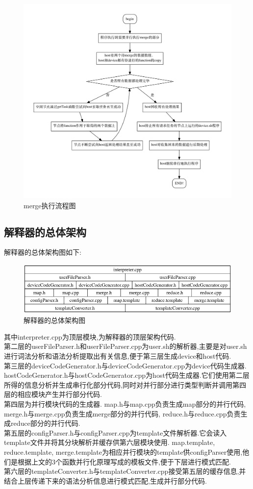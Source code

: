 \documentclass[paper=a4]{ctexart} %
\numberwithin{equation}{section} %
\numberwithin{figure}{section} %
\numberwithin{table}{section} %
\newcommand{\n}{\\\indent}
\begin{document}
\begin{figure}[htbp]
\centering
\includegraphics[width=1\textwidth]{pic/graph_merge.pdf}
\caption{merge执行流程图}
\end{figure}

\clearpage

\subsection{解释器的总体架构}

解释器的总体架构图如下:
\begin{figure}[htbp]
\centering
\includegraphics[width=1\textwidth]{pic/arch.jpg}
\caption{解释器的总体架构图}
\end{figure}

其中interpreter.cpp为顶层模块,为解释器的顶层架构代码.\n
第二层的userFileParser.h和userFileParser.cpp为user.sh的解析器,主要是对user.sh进行词法分析和语法分析提取出有关信息,便于第三层生成device和host代码.\n
第三层的deviceCodeGenerator.h与deviceCodeGenerator.cpp为device代码生成器. hostCodeGenerator.h与hostCodeGenerator.cpp为host代码生成器.它们使用第二层所得的信息分析并生成串行化部分代码,同时对并行部分进行类型判断并调用第四层的相应模块产生并行部分代码.\n
第四层为并行模块代码的生成器. map.h与map.cpp负责生成map部分的并行代码, merge.h与merge.cpp负责生成merge部分的并行代码, reduce.h与reduce.cpp负责生成reduce部分的并行代码.\n
第五层的configParser.h与configParser.cpp为template文件解析器.它会读入template文件并将其分块解析并缓存供第六层模块使用. map.template, reduce.template, merge.template为相应并行模块的template供configParser使用,他们是根据上文的3个函数并行化原理写成的模板文件,便于下层进行模式匹配.\n
第六层的templateConverter.h与templateConverter.cpp接受第五层的缓存信息,并结合上层传递下来的语法分析信息进行模式匹配,生成并行部分代码.
\end{document}

